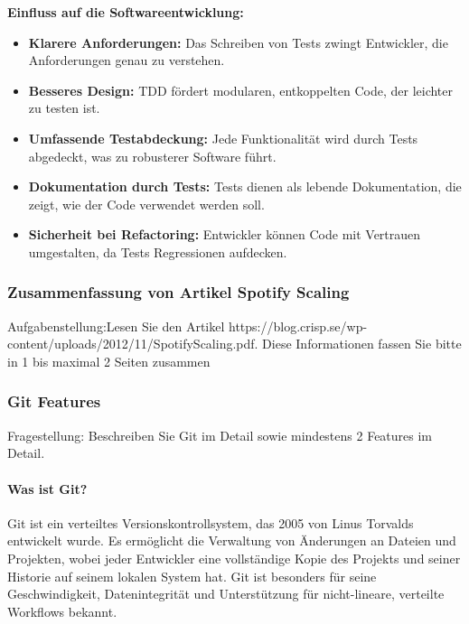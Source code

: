 \textbf{Einfluss auf die Softwareentwicklung:}
\begin{itemize}
    \item \textbf{Klarere Anforderungen:} Das Schreiben von Tests zwingt Entwickler, die Anforderungen genau zu verstehen.
    \item \textbf{Besseres Design:} TDD fördert modularen, entkoppelten Code, der leichter zu testen ist.
    \item \textbf{Umfassende Testabdeckung:} Jede Funktionalität wird durch Tests abgedeckt, was zu robusterer Software führt.
    \item \textbf{Dokumentation durch Tests:} Tests dienen als lebende Dokumentation, die zeigt, wie der Code verwendet werden soll.
    \item \textbf{Sicherheit bei Refactoring:} Entwickler können Code mit Vertrauen umgestalten, da Tests Regressionen aufdecken.
\end{itemize}



\subsubsection{Zusammenfassung von Artikel Spotify Scaling}

Aufgabenstellung:Lesen Sie den Artikel https://blog.crisp.se/wp-content/uploads/2012/11/SpotifyScaling.pdf.
Diese Informationen fassen Sie bitte in 1 bis maximal 2 Seiten zusammen


\subsubsection{Git Features}

Fragestellung: Beschreiben Sie Git im Detail sowie mindestens 2 Features im Detail.

\paragraph{Was ist Git?}
Git ist ein verteiltes Versionskontrollsystem, das 2005 von Linus Torvalds entwickelt wurde.
Es ermöglicht die Verwaltung von Änderungen an Dateien und Projekten,
wobei jeder Entwickler eine vollständige Kopie des Projekts und seiner Historie auf seinem lokalen System hat.
Git ist besonders für seine Geschwindigkeit, Datenintegrität und Unterstützung für nicht-lineare, verteilte 
Workflows bekannt. \cite{github-git}

